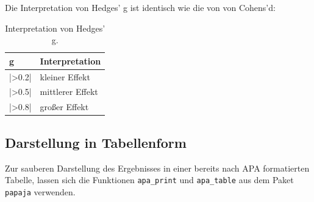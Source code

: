 \documentclass[
]{book}
\newenvironment{Shaded}{\begin{snugshade}}{\end{snugshade}}
\newcommand{\AttributeTok}[1]{\textcolor[rgb]{0.77,0.63,0.00}{#1}}
\newcommand{\FunctionTok}[1]{\textcolor[rgb]{0.00,0.00,0.00}{#1}}
\newcommand{\NormalTok}[1]{#1}
\newcommand{\OtherTok}[1]{\textcolor[rgb]{0.56,0.35,0.01}{#1}}
\newcommand{\SpecialCharTok}[1]{\textcolor[rgb]{0.00,0.00,0.00}{#1}}
\newcommand{\StringTok}[1]{\textcolor[rgb]{0.31,0.60,0.02}{#1}}
\begin{document}
Die Interpretation von Hedges' g ist identisch wie die von von Cohens'd:

\begin{table}[tbp]

\begin{center}
\begin{threeparttable}

\caption{\label{tab:unnamed-chunk-246}Interpretation von Hedges' g.}

\begin{tabular}{ll}
\toprule
g & \multicolumn{1}{c}{Interpretation}\\
\midrule
|>0.2| & kleiner Effekt\\
|>0.5| & mittlerer Effekt\\
|>0.8| & großer Effekt\\
\bottomrule
\end{tabular}

\end{threeparttable}
\end{center}

\end{table}

\hypertarget{darstellung-in-tabellenform-1}{%
\subsection{Darstellung in Tabellenform}\label{darstellung-in-tabellenform-1}}

Zur sauberen Darstellung des Ergebnisses in einer bereits nach APA formatierten Tabelle, lassen sich die Funktionen \texttt{apa\_print} und \texttt{apa\_table} aus dem Paket \texttt{papaja} verwenden.

\begin{Shaded}
\end{Shaded}
\end{document}
